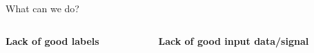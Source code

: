 \documentclass[8pt,xcolor=table,aspectratio=169]{beamer}
\begin{document}
\begin{frame}{What can we do?}


\begin{columns}[t]
\begin{column}{0.5\textwidth}
\centering

\textbf{\large Lack of good labels}

% 
%  
% 

\vspace{2em}


\end{column}
\begin{column}{0.5\textwidth}
\centering

\textbf{\large Lack of good input data/signal}


% 
% 
% 


\end{column}
\end{columns}
\end{frame}
\end{document}
